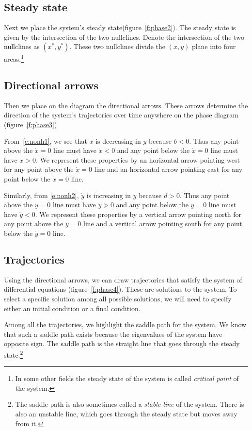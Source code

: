 \documentclass[letterpaper, 11pt, leqno]{article}
\begin{document}
\subsection{Steady state}

Next we place the system's steady state(figure~\ref{f:phase2}). The steady state is given by the intersection of the two nullclines. Denote the intersection of the two nullclines as $(x^{*},y^{*}) $. These two nullclines divide the $(x,y)$ plane into four areas.\footnote{In some other fields the steady state of the system is called \textit{critical point} of the system.}

\subsection{Directional arrows}

Then we place on the diagram the directional arrows. These arrows determine the direction of the system's trajectories over time anywhere on the phase diagram (figure~\ref{f:phase3}). 

From~\eqref{e:nonh1}, we see that $\dot{x}$ is decreasing in $y$ because $b<0$. Thus any point above the $\dot{x}=0$ line must have $\dot{x}<0$ and any point below the $\dot{x}=0$ line must have $\dot{x}>0$. We represent these properties by an horizontal arrow pointing west for any point above the $\dot{x}=0$ line and an horizontal arrow pointing east for any point below the $\dot{x}=0$ line. 

Similarly, from \eqref{e:nonh2}, $\dot{y}$ is increasing in $y$ because $d>0$. Thus any point above the $\dot{y}=0$ line must have $\dot{y}>0$ and any point below the $\dot{y}=0$ line must have $\dot{y}<0$. We represent these properties by a vertical arrow pointing north for any point above the $\dot{y}=0$ line and a vertical arrow pointing south for any point below the $\dot{y}=0$ line. 

\subsection{Trajectories}

Using the directional arrows, we can draw trajectories that satisfy the system of differential equations (figure~\ref{f:phase4}). These are solutions to the system. To select a specific solution among all possible solutions, we will need to specify either an initial condition or a final condition.

Among all the trajectories, we highlight the saddle path for the system. We know that such a saddle path exists because the eigenvalues of the system have opposite sign. The saddle path is the straight line that goes through the steady state.\footnote{The saddle path is also sometimes called a \textit{stable line} of the system. There is also an unstable line, which goes through the steady state but moves away from it.}
\end{document}
